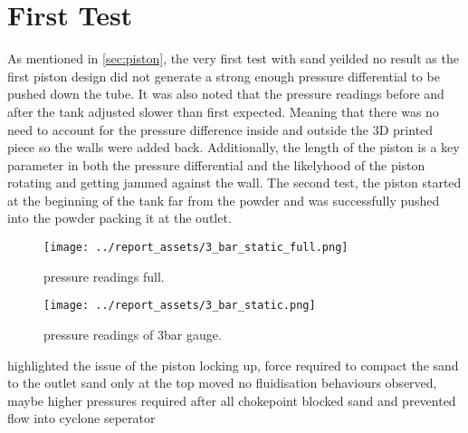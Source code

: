 \section{First Test}\label{sec:first-test}
As mentioned in \autoref{sec:piston}, the very first test with sand yeilded no result as the first piston design did not generate a strong enough pressure differential to be pushed down the tube. It was also noted that the pressure readings before and after the tank adjusted slower than first expected. Meaning that there was no need to account for the pressure difference inside and outside the 3D printed piece so the walls were added back. Additionally, the length of the piston is a key parameter in both the pressure differential and the likelyhood of the piston rotating and getting jammed against the wall. The second test, the piston started at the beginning of the tank far from the powder and was successfully pushed into the powder packing it at the outlet. 
\begin{figure}[htbp]
    \centering

    \begin{minipage}{0.45\textwidth}
        \centering
        \texttt{[image: ../report\_assets/3\_bar\_static\_full.png]}
        \caption{pressure readings full.}\label{fig:static-pres-drop-3bar_full}
    \end{minipage}
    \hfill
    \begin{minipage}{0.45\textwidth}
        \centering
        \texttt{[image: ../report\_assets/3\_bar\_static.png]}
        \caption{pressure readings of 3bar gauge.}\label{fig:static-pressurop-3bar}
    \end{minipage}

\end{figure}
highlighted the issue of the piston locking up,
force required to compact the sand to the outlet
sand only at the top moved
no fluidisation behaviours observed, maybe higher pressures required after all
chokepoint blocked sand and prevented flow into cyclone seperator


\newpage

